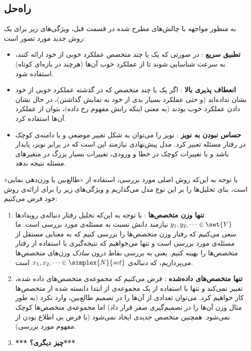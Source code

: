 \documentclass[a4paper,11px]{article}
\begin{document}
\subsection{
راه‌حل
} 
به منظور مواجهه با چالش‌های مطرح شده در قسمت قبل، ویژگی‌های زیر برای یک روش جدید مورد تصور است:
\begin{itemize}
\item \textbf{
تطبیق سریع
}: 
در صورتی که یک یا چند متخصص عملکرد خوبی از خود ارائه کنند، به سرعت شناسایی شوند تا از عملکرد خوب آن‌ها (هرچند در بازه‌ای کوتاه) استفاده شود.
\item \textbf{
انعطاف پذیری بالا
}: 
اگر یک یا چند متخصص که در گذشته عملکرد خوبی از خود نشان نداده‌اند (و حتی عملکرد بسیار بدی از خود به نمایش گذاشتن)، در حال نشان دادن عملکرد خوب بودند (به معنی اینکه رانش مفهوم رخ داده)، بتوان از عملکرد آن‌ها استفاده کرد.

\item \textbf{
حساس نبودن به نویز
}: 
نویز را می‌توان به شکل تغییر موضعی و با دامنه‌ی کوچک در رفتار مسئله تعبیر کرد. مدل پیش‌نهادی نیازمند این است که در برابر نویز، پایدار باشد و با تغییرات کوچک در خطا و ورودی، تغییرات بسیار بزرگ در متغیرهای مسئله نتیجه ندهد.

\end{itemize}

با توجه به این‌که روش اصلی مورد بررسی، استفاده از «طالع‌بین با وزن‌دهی نمایی» است، بنای تحلیل‌ها را بر این نوع مدل می‌گذاریم و ویژگی‌های زیر را برای ارائه‌ی روش خود فرض می‌کنیم:
\begin{enumerate}
\item \textbf{
تنها وزن متخصص‌ها
}: 
با توجه به این‌که تحلیل رفتار دنباله‌ی رویدادها 
$y_1, y_2, \cdots \in \set{Y}$ 
نیازمند دانش نسبت به مسئله‌ی مورد بررسی است. ما سعی می‌کنیم که رفتار وزن متخصص‌ها را بررسی کنیم که به معنایی مستقل از مسئله‌ی مورد بررسی است و تنها می‌خواهیم که نتیجه‌گیری با استفاده از رفتار متخصص‌ها را بهینه کنیم. یعنی به بررسی نقاط درون 
\textit{
سادک
} 
وزن‌های متخصص‌ها می‌پردازیم، که دنباله‌ی 
$x_1, x_2, \cdots \in \simplex{N}{set} $ 
است.

\item \textbf{
تنها متخصص‌های داده‌شده
}: 
فرض می‌کنیم که مجموعه‌ی متخصص‌های داده شده، تغییر نمی‌کند و تنها با استفاده از یک مجموعه‌ی از ابتدا دانسته شده از متخصص‌ها کار خواهیم کرد. می‌توان تعدادی از آن‌ها را در تصمیم طالع‌بین، وارد نکرد (به طور مثال وزن آن‌ها را در تصمیم‌گیری صفر قرار داد) اما مجموعه‌ی متخصص‌ها کوچک نمی‌شود. همچنین متخصص جدیدی ایجاد نمی‌شود (با فرض بی اطلاع بودن از مفهوم مورد بررسی).

\item \textbf{
*** چیز دیگری؟***
}

\end{enumerate}
\end{document}

